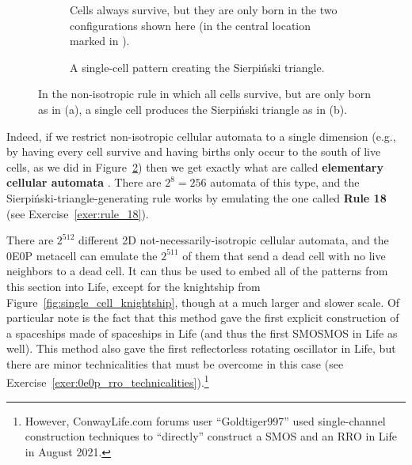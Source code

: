 \begin{figure}[!htb]
	\centering
	\begin{subfigure}{.42\textwidth}
		\centering
		\caption{Cells always survive, but they are only born in the two configurations shown here (in the central location marked in ).}
		\label{fig:non_iso_rule_18}
	\end{subfigure} \hfill \begin{subfigure}{.53\textwidth}
		\centering
		\caption{A single-cell pattern creating the Sierpi\'{n}ski triangle.}
		\label{fig:single_cell_sierpinski}
	\end{subfigure}
	\caption{In the non-isotropic rule in which all cells survive, but are only born as in (a), a single cell produces the Sierpi\'{n}ski triangle as in (b).}\label{fig:single_cell_weird}
\end{figure}

Indeed, if we restrict non-isotropic cellular automata to a single dimension (e.g., by having every cell survive and having births only occur to the south of live cells, as we did in Figure~\ref{fig:single_cell_sierpinski}) then we get exactly what are called \textbf{elementary cellular automata} \cite{Wolfram2002}. There are $2^8 = 256$ automata of this type, and the Sierpi\'{n}ski-triangle-generating rule works by emulating the one called \textbf{Rule 18} (see Exercise~\ref{exer:rule_18}).

There are $2^{512}$ different 2D not-necessarily-isotropic cellular automata, and the 0E0P metacell can emulate the $2^{511}$ of them that send a dead cell with no live neighbors to a dead cell. It can thus be used to embed all of the patterns from this section into Life, except for the knightship from Figure~\ref{fig:single_cell_knightship}, though at a much larger and slower scale. Of particular note is the fact that this method gave the first explicit construction of a spaceships made of spaceships in Life (and thus the first SMOSMOS in Life as well). This method also gave the first reflectorless rotating oscillator in Life, but there are minor technicalities that must be overcome in this case (see Exercise~\ref{exer:0e0p_rro_technicalities}).\footnote{However, ConwayLife.com forums user ``Goldtiger997'' used single-channel construction techniques to ``directly'' construct a SMOS and an RRO in Life in August 2021.}


